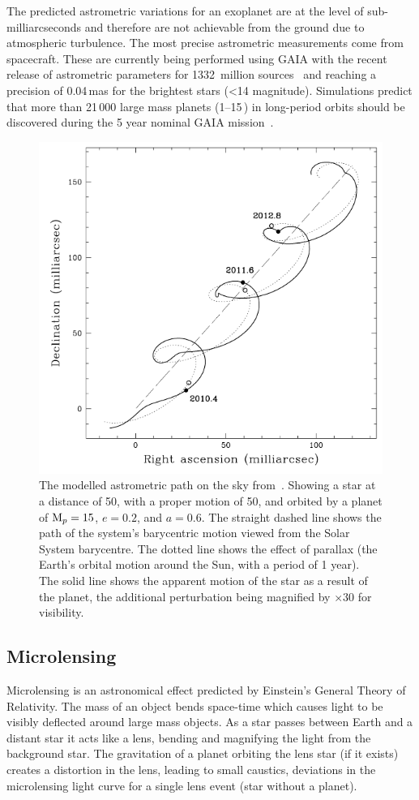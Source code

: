 The predicted astrometric variations for an exoplanet are at the level of sub-milliarcseconds and therefore are not achievable from the ground due to atmospheric turbulence.
The most precise astrometric measurements come from spacecraft.
These are currently being performed using GAIA with the recent release of astrometric parameters for 1332~million sources~\citep{collaboration_gaia_2018} and reaching a precision of 0.04\,mas for the brightest stars (<14 magnitude).
Simulations predict that more than 21\,000 large mass planets (1--15\,\Mjup) in long-period orbits should be discovered during the 5 year nominal GAIA mission~\citep{perryman_astrometric_2014}.

\begin{figure}
    \centering
    \includegraphics[width=0.5\linewidth]{./figures/introduction/Astrometry_Perryman2000.png}
    \caption[Modelled astrometric path on the sky.]{The modelled astrometric path on the sky from~\citet{perryman_extrasolar_2000}.
    Showing a star at a distance of 50\pc, with a proper motion of 50\masperyr{}, and orbited by a planet of \(\textrm{M}_{p}=15\)\Mjup{}, \(e=0.2\), and \(a=0.6\)\AU{}.
    The straight dashed line shows the path of the system's barycentric motion viewed from the Solar System barycentre.
    The dotted line shows the effect of parallax (the Earth's orbital motion around the Sun, with a period of 1 year).
    The solid line shows the apparent motion of the star as a result of the planet, the additional perturbation being magnified by $\times 30$ for visibility.}
    \label{fig:astrometry_perryman}
\end{figure}


\subsection{Microlensing}
\label{subsec:microlensing}
Microlensing is an astronomical effect predicted by Einstein's General Theory of Relativity.
The mass of an object bends space-time which causes light to be visibly deflected around large mass objects.
As a star passes between Earth and a distant star it acts like a lens, bending and magnifying the light from the background star.
The gravitation of a planet orbiting the lens star (if it exists) creates a distortion in the lens, leading to small caustics, deviations in the microlensing light curve for a single lens event (star without a planet).


